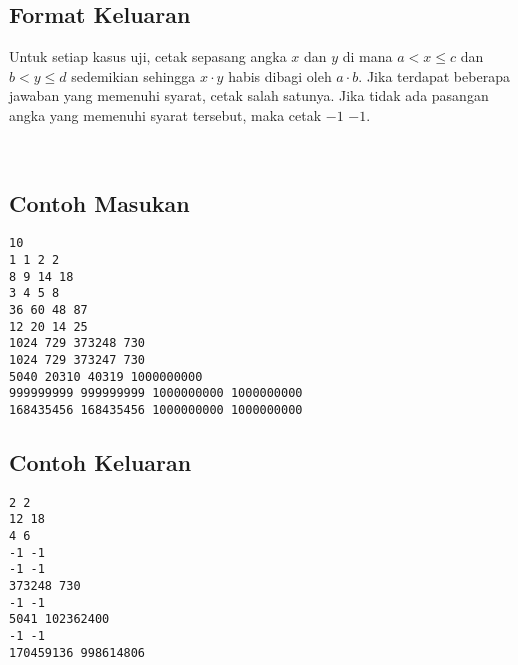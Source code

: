 \documentclass{article}
\begin{document}
\subsection*{Format Keluaran}

Untuk setiap kasus uji, cetak sepasang angka $x$ dan $y$ di mana $a < x \leq c$ dan $b < y \leq d$ sedemikian sehingga $x \cdot y$ habis dibagi oleh $a \cdot b$. Jika terdapat beberapa jawaban yang memenuhi syarat, cetak salah satunya. Jika tidak ada pasangan angka yang memenuhi syarat tersebut, maka cetak $-1$ $-1$.

\\

\begin{multicols}{2}
\subsection*{Contoh Masukan}
\begin{lstlisting}
10
1 1 2 2
8 9 14 18
3 4 5 8
36 60 48 87
12 20 14 25
1024 729 373248 730
1024 729 373247 730
5040 20310 40319 1000000000
999999999 999999999 1000000000 1000000000
168435456 168435456 1000000000 1000000000
\end{lstlisting}
\columnbreak
\subsection*{Contoh Keluaran}
\begin{lstlisting}
2 2
12 18
4 6
-1 -1
-1 -1
373248 730
-1 -1
5041 102362400
-1 -1
170459136 998614806
\end{lstlisting}
\end{multicols}
\end{document}
